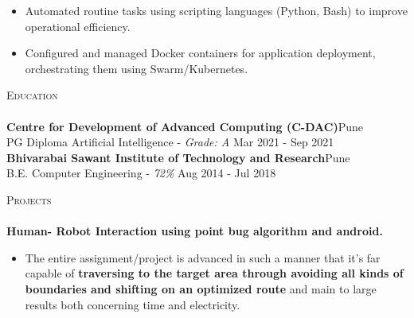 \documentclass[a4paper]{article}
\newcommand{\lineunder} {
    \vspace*{-8pt} \\
    \hspace*{-18pt} \hrulefill \\
}
\newcommand{\header} [1] {
    {\hspace*{-18pt}\vspace*{6pt} \textsc{#1}}
    \vspace*{-6pt} \lineunder
}
\begin{document}
\begin{itemize}
    \item Automated routine tasks using scripting languages (Python, Bash) to improve operational efficiency.
    \item Configured and managed Docker containers for application deployment, orchestrating them using Swarm/Kubernetes.
\end{itemize}

\vspace*{2mm}

\header{Education}
\textbf{Centre for Development of Advanced Computing (C-DAC)}\hfill Pune\\
PG Diploma Artificial Intelligence - \textit{Grade: A} \hfill Mar 2021 - Sep 2021\\
\vspace{2mm}
\textbf{Bhivarabai Sawant Institute of Technology and Research}\hfill Pune\\
B.E. Computer Engineering - \textit{72\%} \hfill Aug 2014 - Jul 2018\\
\vspace{2mm}

\header{Projects}


{\textbf{Human- Robot Interaction using point bug algorithm and android.}}
\begin{itemize} \itemsep 1pt
    \item The entire assignment/project is advanced in such a manner that it's far capable of \textbf{traversing to the target area through avoiding all kinds of boundaries and shifting on an optimized route} and main to large results both concerning time and electricity.
          \\
\end{itemize}
\vspace*{2mm}
\end{document}
